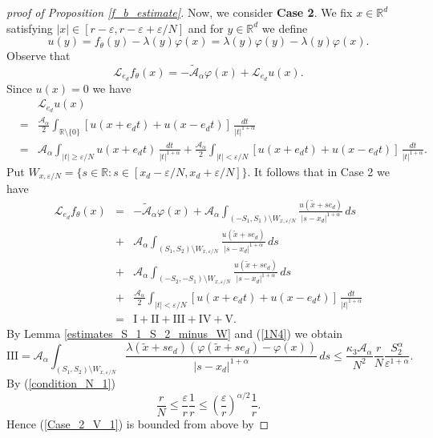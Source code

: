 \documentclass[a4paper,12pt,reqno]{amsart}
\theoremstyle{definition}
\theoremstyle{remark}
\newcommand{\eps}{\varepsilon}
\newcommand{\calA}{\mathcal{A}}
\newcommand{\Aa}{\mathcal{A}_{\alpha}}
\newcommand{\calL}{\mathcal{L}}
\newcommand{\R}{\mathds{R}}
\begin{document}
\begin{proof}[proof of Proposition \ref{f_b_estimate}]
Now, we consider {\bf Case 2}. 
We fix $x \in \R^d$ satisfying $|x| \in [r -\eps, r - \eps + \eps/N]$ and for $y \in \R^d$ we define
$$
u(y) = f_{\theta}(y) -\lambda(y) \varphi(x)= \lambda(y) \varphi(y) -\lambda(y) \varphi(x).
$$
Observe that 
%
$$
\calL_{e_d} f_{\theta}(x) = - \tilde{\calA}_{\alpha}  \varphi(x) 
+ \calL_{e_d} u(x).
$$
Since  
$
u(x) = 0$
we have
\begin{eqnarray*}
&&\calL_{e_d} u(x)\\
&=& 
\frac{\Aa}{2}  \int_{\R \setminus \{0\}} \left[u(x + e_d t) + u(x - e_d t) \right] \, \frac{dt}{|t|^{1 + \alpha}}\\ 
&=& \Aa \int_{|t| \ge \eps/N} u(x + e_d t) \, \frac{dt}{|t|^{1 + \alpha}}
+ \frac{\Aa}{2}  \int_{|t| < \eps/N} \left[u(x + e_d t) + u(x - e_d t) \right] \, \frac{dt}{|t|^{1 + \alpha}}.
\end{eqnarray*}
Put $W_{x, \eps/N} = \{s \in \R: s \in [x_d - \eps/N, x_d + \eps/N]\}$. 
It follows that in Case 2 we have
\begin{eqnarray*}
\calL_{e_d} f_{\theta}(x) &=& - \tilde{\calA}_{\alpha}  \varphi(x)
+ \calA_{\alpha} \int_{(-S_1,S_1) \setminus W_{x, \eps/N}} \frac{u(\tilde{x} +s e_d)}{|s - x_d|^{1+\alpha}} \, ds\\
&+&   \calA_{\alpha} \int_{(S_1,S_2) \setminus W_{x, \eps/N}} \frac{u(\tilde{x} +s e_d)}{|s - x_d|^{1+\alpha}} \, ds\\
&+&   \calA_{\alpha} \int_{(-S_2,-S_1) \setminus W_{x, \eps/N}} \frac{u(\tilde{x} +s e_d)}{|s - x_d|^{1+\alpha}} \, ds\\ 
&+& \frac{\Aa}{2}  \int_{|t| < \eps/N} \left[u(x + e_d t) + u(x - e_d t) \right] \, \frac{dt}{|t|^{1 + \alpha}}\\
&=& \text{I} + \text{II} + \text{III} + \text{IV} + \text{V}.
\end{eqnarray*}
By Lemma \ref{estimates_S_1_S_2_minus_W} and (\ref{1N4}) we obtain
\begin{equation}
\label{Case_2_V_1}
\text{III} =
\calA_{\alpha}  \int_{(S_1,S_2) \setminus W_{x, \eps/N}} 
\frac{\lambda(\tilde{x} + s e_d) (\varphi(\tilde{x} + s e_d) - \varphi(x)) }{|s - x_d|^{1 + \alpha}} \, ds
\le \frac{\kappa_3 \calA_{\alpha} }{N^2} \frac{r}{N} \frac {S^{\alpha}_2 }{ \eps^{1 + \alpha}}.
\end{equation}
By (\ref{condition_N_1})%
$$
\frac{r}{N} \le \frac{\eps }{r} \frac1{r}  \le \left(\frac{\eps}{r}\right)^{\alpha/2}\frac1{r}.
$$
%
Hence (\ref{Case_2_V_1}) is bounded from above by

\end{proof}
\end{document}
